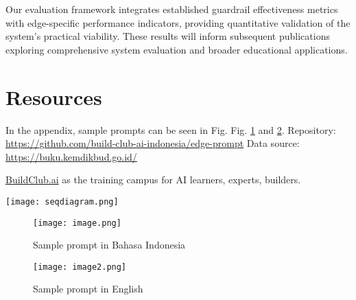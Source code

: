 \documentclass[sigconf]{acmart}
\begin{document}
Our evaluation framework integrates established guardrail effectiveness metrics \cite{niknazar_building_2024} with edge-specific performance indicators, providing quantitative validation of the system's practical viability. These results will inform subsequent publications exploring comprehensive system evaluation and broader educational applications.

\section{Resources}
In the appendix, sample prompts can be seen in Fig. Fig. \ref{fig:prompt_bahasa} and \ref{fig:prompt_english}.
Repository: \url{https://github.com/build-club-ai-indonesia/edge-prompt}
Data source: \url{https://buku.kemdikbud.go.id/}
  

\begin{acks}
\href{https://www.buildclub.ai/}{BuildClub.ai} as the training campus for AI learners, experts, builders.
\end{acks}





\appendix

\begin{figure*}[t]
    \centering
    \texttt{[image: seqdiagram.png]}
    \caption{Sequence diagram of the system.}
    \label{fig:teaser}
\end{figure*}

\begin{figure}
    \centering
    \texttt{[image: image.png]}
    \caption{Sample prompt in Bahasa Indonesia}
    \label{fig:prompt_bahasa}
\end{figure}

\begin{figure}
    \centering
    \texttt{[image: image2.png]}
    \caption{Sample prompt in English}
    \label{fig:prompt_english}
\end{figure}
\end{document}
